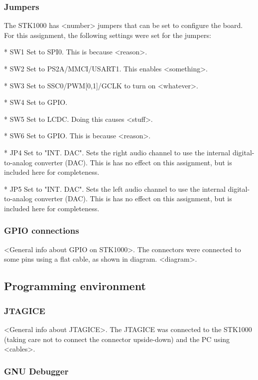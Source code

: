 \documentclass{article}
\begin{document}
\subsubsection{Jumpers}

The STK1000 has <number> jumpers that can be set to configure the board.
For this assignment, the following settings were set for the jumpers:

* SW1
Set to SPI0.
This is because <reason>.


* SW2
Set to PS2A/MMCI/USART1. 
This enables <something>.

* SW3
Set to SSC0/PWM[0,1]/GCLK to turn on <whatever>.

* SW4
Set to GPIO.

* SW5
Set to LCDC.
Doing this causes <stuff>.

* SW6
Set to GPIO.
This is because <reason>.

* JP4
Set to "INT. DAC".
Sets the right audio channel to use the internal digital-to-analog converter (DAC).
This is has no effect on this assignment, but is included here for completeness.

* JP5
Set to "INT. DAC".
Sets the left audio channel to use the internal digital-to-analog converter (DAC).
This is has no effect on this assignment, but is included here for completeness.

\subsubsection{GPIO connections}

<General info about GPIO on STK1000>.
The connectors were connected to some pins using a flat cable, as shown in diagram.
<diagram>.


\subsection{Programming environment}

\subsubsection{JTAGICE}

<General info about JTAGICE>.
The JTAGICE was connected to the STK1000 (taking care not to connect the connector upside-down) and the PC using <cables>.

\subsubsection{GNU Debugger}
\end{document}
